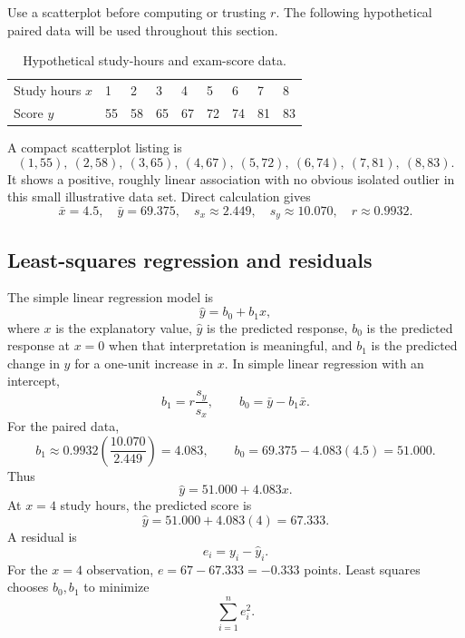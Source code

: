 \documentclass[11pt]{article}
\begin{document}
Use a scatterplot before computing or trusting $r$.  The following
hypothetical paired data will be used throughout this section.

\begin{table}[ht]
\centering
\caption{Hypothetical study-hours and exam-score data.}\label{tab:reg-data}
\begin{tabularx}{0.7\textwidth}{@{}lYYYYYYYY@{}}
\toprule
Study hours $x$ & 1 & 2 & 3 & 4 & 5 & 6 & 7 & 8 \\
Score $y$ & 55 & 58 & 65 & 67 & 72 & 74 & 81 & 83 \\
\bottomrule
\end{tabularx}
\end{table}

A compact scatterplot listing is
\[
(1,55),\ (2,58),\ (3,65),\ (4,67),\ (5,72),\ (6,74),\ (7,81),\ (8,83).
\]
It shows a positive, roughly linear association with no obvious isolated
outlier in this small illustrative data set.  Direct calculation gives
\[
\bar{x}=4.5,
\quad \bar{y}=69.375,
\quad s_x\approx2.449,
\quad s_y\approx10.070,
\quad r\approx0.9932.
\]

\subsection{Least-squares regression and residuals}
The simple linear regression model is
\begin{equation}\label{eq:regline}
\widehat y=b_0+b_1x,
\end{equation}
where $x$ is the explanatory value, $\widehat y$ is the predicted response,
$b_0$ is the predicted response at $x=0$ when that interpretation is
meaningful, and $b_1$ is the predicted change in $y$ for a one-unit increase
in $x$.  In simple linear regression with an intercept,
\begin{equation}\label{eq:slope-intercept}
b_1=r\frac{s_y}{s_x},
\qquad b_0=\bar y-b_1\bar x.
\end{equation}
For the paired data,
\[
b_1\approx0.9932\left(\frac{10.070}{2.449}\right)=4.083,
\qquad b_0=69.375-4.083(4.5)=51.000.
\]
Thus
\[
\widehat y=51.000+4.083x.
\]
At $x=4$ study hours, the predicted score is
\[
\widehat y=51.000+4.083(4)=67.333.
\]
A residual is
\begin{equation}\label{eq:residual}
e_i=y_i-\widehat y_i.
\end{equation}
For the $x=4$ observation, $e=67-67.333=-0.333$ points.  Least squares chooses
$b_0,b_1$ to minimize
\begin{equation}\label{eq:least-squares}
\sum_{i=1}^{n}e_i^2.
\end{equation}
\end{document}
